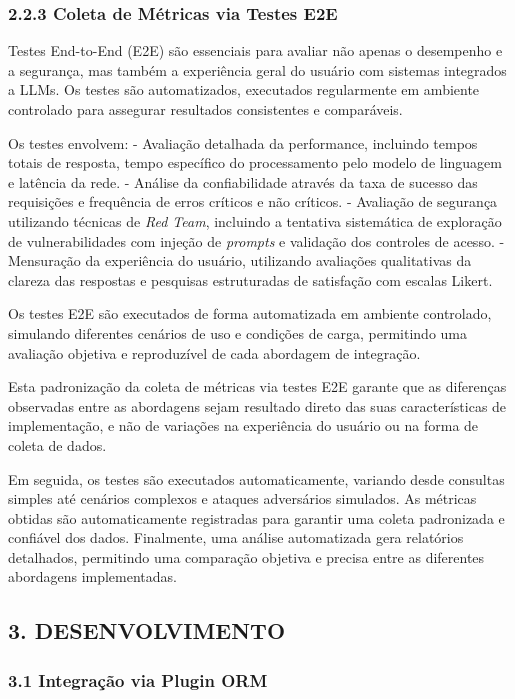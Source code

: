 \documentclass[
]{article}
\begin{document}
\subsubsection{2.2.3 Coleta de Métricas via Testes
E2E}\label{coleta-de-muxe9tricas-via-testes-e2e}

Testes End-to-End (E2E) são essenciais para avaliar não apenas o
desempenho e a segurança, mas também a experiência geral do usuário com
sistemas integrados a LLMs. Os testes são automatizados, executados
regularmente em ambiente controlado para assegurar resultados
consistentes e comparáveis.

Os testes envolvem: - Avaliação detalhada da performance, incluindo
tempos totais de resposta, tempo específico do processamento pelo modelo
de linguagem e latência da rede. - Análise da confiabilidade através da
taxa de sucesso das requisições e frequência de erros críticos e não
críticos. - Avaliação de segurança utilizando técnicas de \emph{Red
Team}, incluindo a tentativa sistemática de exploração de
vulnerabilidades com injeção de \emph{prompts} e validação dos controles
de acesso. - Mensuração da experiência do usuário, utilizando avaliações
qualitativas da clareza das respostas e pesquisas estruturadas de
satisfação com escalas Likert.

Os testes E2E são executados de forma automatizada em ambiente
controlado, simulando diferentes cenários de uso e condições de carga,
permitindo uma avaliação objetiva e reproduzível de cada abordagem de
integração.

Esta padronização da coleta de métricas via testes E2E garante que as
diferenças observadas entre as abordagens sejam resultado direto das
suas características de implementação, e não de variações na experiência
do usuário ou na forma de coleta de dados.

Em seguida, os testes são executados automaticamente, variando desde
consultas simples até cenários complexos e ataques adversários
simulados. As métricas obtidas são automaticamente registradas para
garantir uma coleta padronizada e confiável dos dados. Finalmente, uma
análise automatizada gera relatórios detalhados, permitindo uma
comparação objetiva e precisa entre as diferentes abordagens
implementadas.

\subsection{3. DESENVOLVIMENTO}\label{desenvolvimento}

\subsubsection{3.1 Integração via Plugin
ORM}\label{integrauxe7uxe3o-via-plugin-orm}
\end{document}
